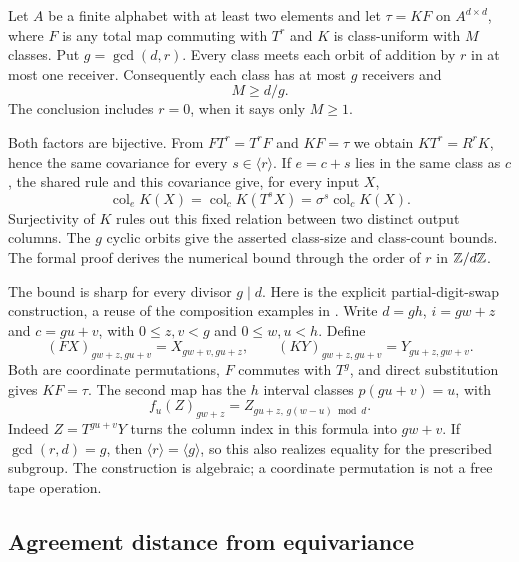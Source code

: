\begin{theorem}\label{thm:periodic-first}
Let $A$ be a finite alphabet with at least two elements and let
$\tau=KF$ on $A^{d\times d}$, where $F$ is any total map commuting
with $T^r$ and $K$ is class-uniform with $M$ classes.  Put
$g=\gcd(d,r)$.  Every class meets each orbit of addition by $r$ in at
most one receiver.  Consequently each class has at most $g$ receivers and
\begin{equation}\label{eq:periodic-class-bound}
 M\ge d/g.
\end{equation}
The conclusion includes $r=0$, when it says only $M\ge1$.
\end{theorem}
\begin{outline}
Both factors are bijective.  From $FT^r=T^rF$ and $KF=\tau$ we obtain
$KT^r=R^rK$, hence the same covariance for every $s\in\langle r\rangle$.
If $e=c+s$ lies in the same class as $c$, the shared rule and this covariance
give, for every input $X$,
\[
 \operatorname{col}_eK(X)
 =\operatorname{col}_cK(T^sX)
 =\sigma^s\operatorname{col}_cK(X).
\]
Surjectivity of $K$ rules out this fixed relation between two distinct
output columns.  The $g$ cyclic orbits give the asserted class-size and
class-count bounds.  The formal proof derives the numerical bound through
the order of $r$ in $\mathbb{Z}/d\mathbb{Z}$.
\end{outline}

The bound is sharp for every divisor $g\mid d$.  Here is the explicit
partial-digit-swap construction, a reuse of the composition examples in
\cite{SeventeenthPaper2026}.  Write $d=gh$, $i=gw+z$ and $c=gu+v$, with
$0\le z,v<g$ and $0\le w,u<h$.  Define
\[
 (FX)_{gw+z,gu+v}=X_{gw+v,gu+z},\qquad
 (KY)_{gw+z,gu+v}=Y_{gu+z,gw+v}.
\]
Both are coordinate permutations, $F$ commutes with $T^g$, and direct
substitution gives $KF=\tau$.  The second map has the $h$ interval classes
$p(gu+v)=u$, with
\[
 f_u(Z)_{gw+z}=Z_{gu+z,\,g(w-u)\bmod d}.
\]
Indeed $Z=T^{gu+v}Y$ turns the column index in this formula into $gw+v$.
If $\gcd(r,d)=g$, then $\langle r\rangle=\langle g\rangle$, so this
also realizes equality for the prescribed subgroup.  The construction
is algebraic; a coordinate permutation is not a free tape operation.

\subsection{Agreement distance from equivariance}


